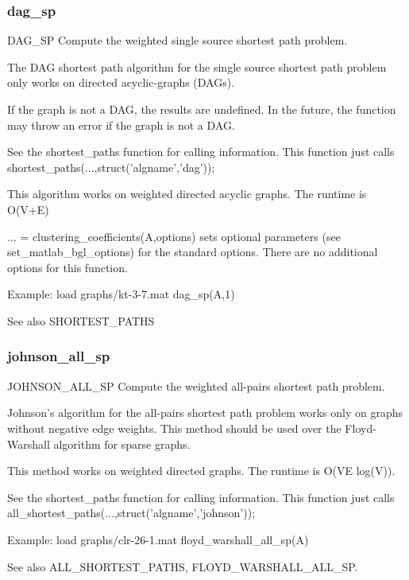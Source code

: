 \subsubsection*{dag\_sp}
\begin{mcode}
  DAG_SP Compute the weighted single source shortest path problem.
 
  The DAG shortest path algorithm for the single source shortest path
  problem only works on directed acyclic-graphs (DAGs).  
 
  If the graph is not a DAG, the results are undefined.  In the future, the
  function may throw an error if the graph is not a DAG.
 
  See the shortest_paths function for calling information.  This function 
  just calls shortest_paths(...,struct('algname','dag'));
 
  This algorithm works on weighted directed acyclic graphs.
  The runtime is O(V+E)
 
  ... = clustering_coefficients(A,options) sets optional parameters (see 
  set_matlab_bgl_options) for the standard options.
     There are no additional options for this function.
 
  Example:
     load graphs/kt-3-7.mat
     dag_sp(A,1)
 
  See also SHORTEST_PATHS
\end{mcode}
\newpage
\subsubsection*{johnson\_all\_sp}
\begin{mcode}
  JOHNSON_ALL_SP Compute the weighted all-pairs shortest path problem.
 
  Johnson's algorithm for the all-pairs shortest path problem 
  works only on graphs without negative edge weights.  This method should
  be used over the Floyd-Warshall algorithm for sparse graphs.  
 
  This method works on weighted directed graphs.
  The runtime is O(VE log(V)).
 
  See the shortest_paths function for calling information.  This function 
  just calls all_shortest_paths(...,struct('algname','johnson'));
 
  Example:
     load graphs/clr-26-1.mat
     floyd_warshall_all_sp(A)
 
  See also ALL_SHORTEST_PATHS, FLOYD_WARSHALL_ALL_SP.
\end{mcode}
\newpage

